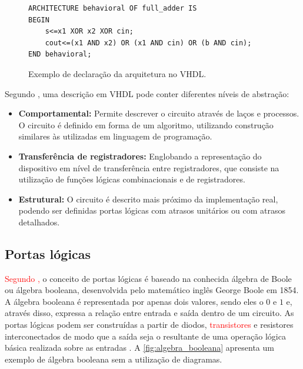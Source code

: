 \begin{figure}[!htp]
\caption{\label{fig:arquitetura} Exemplo de declaração da arquitetura no VHDL.}
	\begin{center}
    \begin{minipage}{0.6\textwidth}
    \begin{lstlisting}       
ARCHITECTURE behavioral OF full_adder IS
BEGIN
	s<=x1 XOR x2 XOR cin;
    cout<=(x1 AND x2) OR (x1 AND cin) OR (b AND cin);
END behavioral;

\end{lstlisting}
    \end{minipage}
	\end{center}
\end{figure}



Segundo , uma descrição em VHDL pode conter diferentes níveis de abstração:
\begin{itemize}
  \item \textbf{Comportamental:} Permite descrever o circuito através de laços e processos. O circuito é definido em forma de um algoritmo, utilizando construção similares às utilizadas em linguagem de programação.
  
  \item \textbf{Transferência de registradores:} Englobando a representação do dispositivo em nível de transferência entre registradores, que consiste na utilização de funções lógicas combinacionais e de registradores.
  
  \item \textbf{Estrutural:} O circuito é descrito mais próximo da implementação real, podendo ser definidas portas lógicas com atrasos unitários ou com atrasos detalhados.
\end{itemize}

\subsection{Portas lógicas}

\textcolor{red}{Segundo ,} o conceito de portas lógicas é baseado na conhecida álgebra de Boole ou álgebra booleana, desenvolvida pelo matemático inglês George Boole em 1854. A álgebra booleana é representada por apenas dois valores, sendo eles o $0$ e $1$ e, através disso, expressa a relação entre entrada e saída dentro de um circuito. As portas lógicas podem ser construídas a partir de diodos, \textcolor{red}{transistores} e resistores interconectados de modo que a saída seja o resultante de uma operação lógica básica realizada sobre as entradas \cite{tocci2003sistemas}. A \autoref{fig:algebra_booleana} apresenta um exemplo de álgebra booleana sem a utilização de diagramas.

